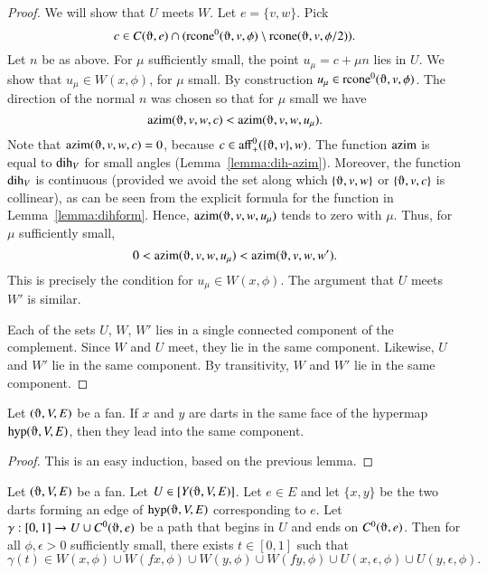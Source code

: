 \begin{proof}
We will show that $U$ meets $W$.    Let $e=\{v,w\}$. Pick 
 $$c\in C(\orgn,e) \cap 
      (\op{rcone}^0(\orgn,v,\phi)\setminus \op{rcone}(\orgn,v,\phi/2)).
 $$
Let $n$ be as above.  For $\mu$ sufficiently small, the point
$u_\mu=c + \mu n$ lies in  $U$.  We show that $u_\mu\in W(x,\phi)$, for $\mu$ small.
By construction $u_\mu\in \op{rcone}^0(\orgn,v,\phi)$.
The direction of the normal $n$ was chosen so that for $\mu$ small
we have
   $$
   \op{azim}(\orgn,v,w,c) < \op{azim}(\orgn,v,w,u_\mu).
   $$
Note that $\op{azim}(\orgn,v,w,c) = 0$, because 
$c\in\op{aff}_+^0(\{\orgn,v\},w)$. 
The function ${\operatorname{azim}}$ is equal to ${\operatorname{dih}}_V$ for
small angles (Lemma~\ref{lemma:dih-azim}).  Moreover,
the function $\operatorname{dih}_V$ is continuous (provided
we avoid the set along which $\{\orgn,v,w\}$ or $\{\orgn,v,c\}$ is
collinear), as can be seen
from the explicit formula 
for the function in Lemma~\ref{lemma:dihform}.
Hence, $\op{azim}(\orgn,v,w,u_\mu)$ tends to zero with $\mu$.
Thus, for $\mu$ sufficiently small,
   $$
   0 < \op{azim}(\orgn,v,w,u_\mu) < \op{azim}(\orgn,v,w,w').
   $$
This is precisely the condition for $u_\mu\in W(x,\phi)$.
The argument that $U$ meets
$W'$ is similar.

Each of the sets $U$, $W$, $W'$ lies in a single connected
component of the complement.  Since $W$ and $U$ meet, they
lie in the same component.  Likewise, $U$ and $W'$ lie in the
same component.  By transitivity, $W$ and $W'$ lie in the same
component.
\end{proof}

\begin{lemma}\label{lemma:face-component} 
Let $(\orgn,V,E)$ be a fan.
If $x$ and $y$ are darts in the same face of the hypermap
$\op{hyp}(\orgn,V,E)$, then they lead into the same component.
\end{lemma}

\begin{proof}  This is an easy induction, based on the previous
lemma.  
\end{proof}



\begin{lemma}\label{lemma:approach-Ce}
Let $(\orgn,V,E)$ be a fan.  Let $U\in\comp{Y(\orgn,V,E)}$.  
Let $e\in E$ and let $\{x,y\}$
be the two darts forming an edge of $\op{hyp}(\orgn,V,E)$
corresponding to $e$.  Let $\gamma:[0,1]\to U\cup C^0(\orgn,e)$
be a path that begins in $U$ and ends on $C^0(\orgn,e)$.
Then for all $\phi,\epsilon>0$ sufficiently small,
there exists  $t\in[0,1]$ such that
  $$\gamma(t)\in 
  W(x,\phi) \cup 
  W(f x,\phi)\cup 
  W(y,\phi)\cup 
  W(f y,\phi) 
  \cup U(x,\epsilon,\phi)
  \cup U(y,\epsilon,\phi).
  $$
\end{lemma}

